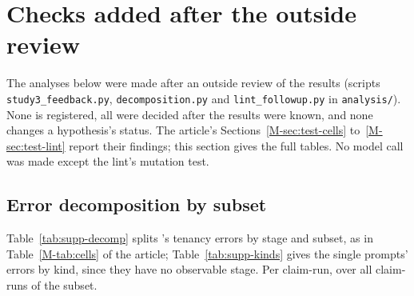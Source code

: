 \section{Checks added after the outside review}
\label{supp:checks}

The analyses below were made after an outside review of the results (scripts \texttt{study3\_\allowbreak{}feedback.py}, \texttt{decomposition.py} and \texttt{lint\_\allowbreak{}followup.py} in \texttt{analysis/}). None is registered, all were decided after the results were known, and none changes a hypothesis's status. The article's Sections~\ref{M-sec:test-cells} to~\ref{M-sec:test-lint} report their findings; this section gives the full tables. No model call was made except the lint's mutation test.

\subsection{Error decomposition by subset}
\label{supp:decomposition}

Table~\ref{tab:supp-decomp} splits \casepath's tenancy errors by stage and subset, as in Table~\ref{M-tab:cells} of the article; Table~\ref{tab:supp-kinds} gives the single prompts' errors by kind, since they have no observable stage. Per claim-run, over all claim-runs of the subset.

